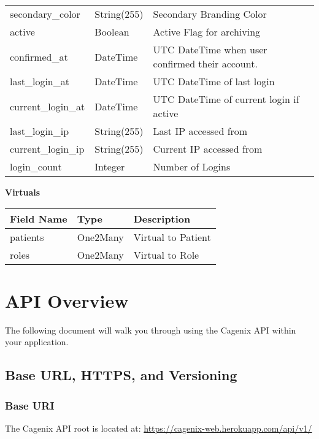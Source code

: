 \documentclass[letterpaper,10pt,english]{sphinxmanual}
\begin{document}
\begin{tabulary}{\linewidth}{|L|L|L|}
secondary\_color
 & 
String(255)
 & 
Secondary Branding Color
\\

active
 & 
Boolean
 & 
Active Flag for archiving
\\

confirmed\_at
 & 
DateTime
 & 
UTC DateTime when user confirmed
their account.
\\

last\_login\_at
 & 
DateTime
 & 
UTC DateTime of last login
\\

current\_login\_at
 & 
DateTime
 & 
UTC DateTime of current login if active
\\

last\_login\_ip
 & 
String(255)
 & 
Last IP accessed from
\\

current\_login\_ip
 & 
String(255)
 & 
Current IP accessed from
\\

login\_count
 & 
Integer
 & 
Number of Logins
\\
\hline\end{tabulary}


\textbf{Virtuals}

\begin{tabulary}{\linewidth}{|L|L|L|}
\hline
\textsf{\relax 
Field Name
} & \textsf{\relax 
Type
} & \textsf{\relax 
Description
}\\
\hline
patients
 & 
One2Many
 & 
Virtual to Patient
\\

roles
 & 
One2Many
 & 
Virtual to Role
\\
\hline\end{tabulary}



\chapter{API Overview}
\label{dev-api-overview:api-overview}\label{dev-api-overview::doc}
The following document will walk you through using the Cagenix API
within your application.


\section{Base URL, HTTPS, and Versioning}
\label{dev-api-overview:base-url-https-and-versioning}

\subsection{Base URI}
\label{dev-api-overview:base-uri}
The Cagenix API root is located at:
\href{https://cagenix-web.herokuapp.com/api/v1/}{https://cagenix-web.herokuapp.com/api/v1/}
\end{document}
